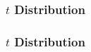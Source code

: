 \documentclass[handout]{beamer}
\newcommand{\blue}[1]{\textcolor{blue2}{#1}}
\begin{document}
\begin{frame}
\frametitle{$t$ Distribution}
%
%

\end{frame}


\begin{frame}
\frametitle{$t$ Distribution}
%

\end{frame}
\end{document}
